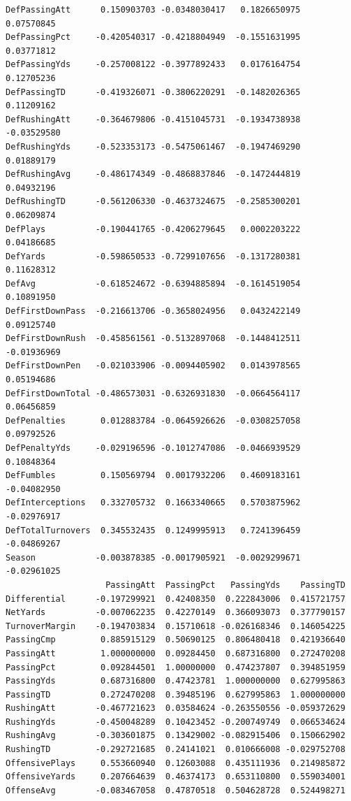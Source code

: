 \documentclass[
  letterpaper,
  DIV=11,
  numbers=noendperiod]{scrreprt}
\begin{document}
\begin{verbatim}
DefPassingAtt      0.150903703 -0.0348030417   0.1826650975  0.07570845
DefPassingPct     -0.420540317 -0.4218804949  -0.1551631995  0.03771812
DefPassingYds     -0.257008122 -0.3977892433   0.0176164754  0.12705236
DefPassingTD      -0.419326071 -0.3806220291  -0.1482026365  0.11209162
DefRushingAtt     -0.364679806 -0.4151045731  -0.1934738938 -0.03529580
DefRushingYds     -0.523353173 -0.5475061467  -0.1947469290  0.01889179
DefRushingAvg     -0.486174349 -0.4868837846  -0.1472444819  0.04932196
DefRushingTD      -0.561206330 -0.4637324675  -0.2585300201  0.06209874
DefPlays          -0.190441765 -0.4206279645   0.0002203222  0.04186685
DefYards          -0.598650533 -0.7299107656  -0.1317280381  0.11628312
DefAvg            -0.618524672 -0.6394885894  -0.1614519054  0.10891950
DefFirstDownPass  -0.216613706 -0.3658024956   0.0432422149  0.09125740
DefFirstDownRush  -0.458561561 -0.5132897068  -0.1448412511 -0.01936969
DefFirstDownPen   -0.021033906 -0.0094405902   0.0143978565  0.05194686
DefFirstDownTotal -0.486573031 -0.6326931830  -0.0664564117  0.06456859
DefPenalties       0.012883784 -0.0645926626  -0.0308257058  0.09792526
DefPenaltyYds     -0.029196596 -0.1012747086  -0.0466939529  0.10848364
DefFumbles         0.150569794  0.0017932206   0.4609183161 -0.04082950
DefInterceptions   0.332705732  0.1663340665   0.5703875962 -0.02976917
DefTotalTurnovers  0.345532435  0.1249995913   0.7241396459 -0.04869267
Season            -0.003878385 -0.0017905921  -0.0029299671 -0.02961025
                    PassingAtt  PassingPct   PassingYds    PassingTD
Differential      -0.197299921  0.42408350  0.222843006  0.415721757
NetYards          -0.007062235  0.42270149  0.366093073  0.377790157
TurnoverMargin    -0.194703834  0.15710618 -0.026168346  0.146054225
PassingCmp         0.885915129  0.50690125  0.806480418  0.421936640
PassingAtt         1.000000000  0.09284450  0.687316800  0.272470208
PassingPct         0.092844501  1.00000000  0.474237807  0.394851959
PassingYds         0.687316800  0.47423781  1.000000000  0.627995863
PassingTD          0.272470208  0.39485196  0.627995863  1.000000000
RushingAtt        -0.467721623  0.03584624 -0.263550556 -0.059372629
RushingYds        -0.450048289  0.10423452 -0.200749749  0.066534624
RushingAvg        -0.303601875  0.13429002 -0.082915406  0.150662902
RushingTD         -0.292721685  0.24141021  0.010666008 -0.029752708
OffensivePlays     0.553660940  0.12603088  0.435111936  0.214985872
OffensiveYards     0.207664639  0.46374173  0.653110800  0.559034001
OffenseAvg        -0.083467058  0.47870518  0.504628728  0.524498271

\end{verbatim}
\end{document}

